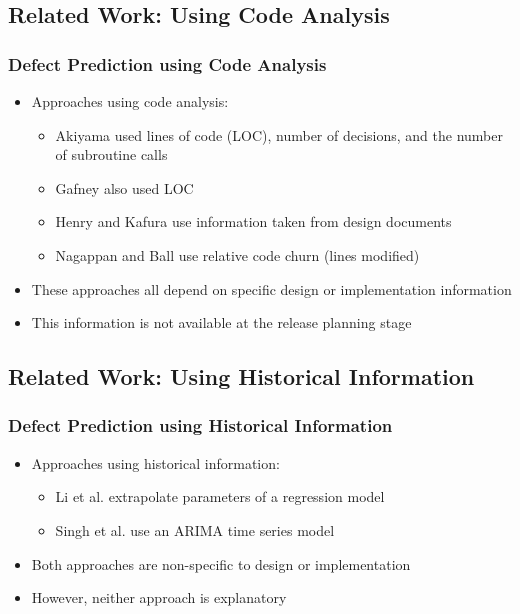 \documentclass[presentation]{beamer}
\begin{document}
\subsection{Related Work: Using Code Analysis}

\begin{frame}[t]
\frametitle{Defect Prediction using Code Analysis}
\begin{itemize}
\item{Approaches using code analysis:
  \begin{itemize}
  \item{Akiyama used lines of code (LOC), number of decisions, and the number of subroutine calls \cite{1971_akiyama}}
  \item{Gafney also used LOC \cite{1984_gaffney_estimating}}
  \item{Henry and Kafura use information taken from design documents \cite{1984_henry_evaluation}}
  \item{Nagappan and Ball use relative code churn (lines modified) \cite{2005_nagappan_codechurn}}
  \end{itemize}
}
\item{These approaches all depend on specific design or implementation information}
\item{This information is not available at the release planning stage}
\end{itemize}
\end{frame}

\subsection{Related Work: Using Historical Information}

\begin{frame}[t]
\frametitle{Defect Prediction using Historical Information}
\begin{itemize}
\item{Approaches using historical information:
  \begin{itemize}
  \item{Li et al. extrapolate parameters of a regression model \cite{2004_li_emperical_eval}}
  \item{Singh et al. use an ARIMA time series model \cite{2010_singh_predicting}}
  \end{itemize}
}
\item{Both approaches are non-specific to design or implementation}
\item{However, neither approach is explanatory}
\end{itemize}
\end{frame}
\end{document}
